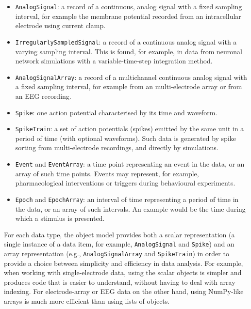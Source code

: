\documentclass{frontiers}
\begin{document}
\begin{itemize}
\item \lstinline`AnalogSignal`: a record of a continuous, analog signal with a fixed sampling interval, for example the membrane potential recorded from an intracellular electrode using current clamp.
\item \lstinline`IrregularlySampledSignal`: a record of a continuous analog signal with a varying sampling interval. This is found, for example, in data from neuronal network simulations with a variable-time-step integration method.
\item \lstinline`AnalogSignalArray`: a record of a multichannel continuous analog signal with a fixed sampling interval, for example from an multi-electrode array or from an EEG recording.
\item \lstinline`Spike`: one action potential characterised by its time and waveform.
\item \lstinline`SpikeTrain`: a set of action potentials (spikes) emitted by the same unit in a period of time (with optional waveforms). Such data is generated by spike sorting from multi-electrode recordings, and directly by simulations.
\item \lstinline`Event` and \lstinline`EventArray`: a time point representing an event in the data, or an array of such time points. Events may represent, for example, pharmacological interventions or triggers during behavioural experiments.
\item \lstinline`Epoch` and \lstinline`EpochArray`: an interval of time representing a period of time in the data, or an array of such intervals. An example would be the time during which a stimulus is presented.
\end{itemize}

For each data type, the object model provides both a scalar representation (a single instance of a data item, for example, \lstinline`AnalogSignal` and \lstinline`Spike`) and an array representation (e.g., \lstinline`AnalogSignalArray` and \lstinline`SpikeTrain`) in order to provide a choice between simplicity and efficiency in data analysis. For example, when working with single-electrode data, using the scalar objects is simpler and produces code that is easier to understand, without having to deal with array indexing. For electrode-array or EEG data on the other hand, using NumPy-like arrays is much more efficient than using lists of objects.
\end{document}
